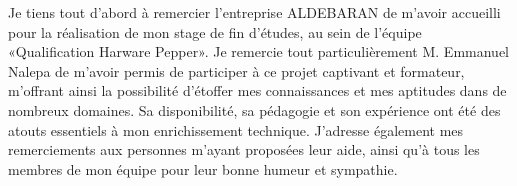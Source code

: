 Je tiens tout d'abord à remercier l'entreprise ALDEBARAN de m’avoir accueilli pour la réalisation de mon stage de fin d'études, au sein de l'équipe «Qualification Harware Pepper».
Je remercie tout particulièrement M. Emmanuel Nalepa de m'avoir permis de participer à ce projet captivant et formateur, m’offrant ainsi la possibilité d'étoffer mes connaissances et mes aptitudes dans de nombreux domaines. Sa disponibilité, sa pédagogie et son expérience ont été des atouts essentiels à mon enrichissement technique.
J’adresse également mes remerciements aux personnes m'ayant proposées leur aide, ainsi qu'à tous les membres de mon équipe pour leur bonne humeur et sympathie.